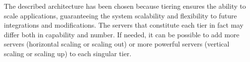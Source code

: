 The described architecture has been chosen because tiering ensures the ability to scale applications, guaranteeing the system scalability and flexibility to future integrations and modifications.
The servers that constitute each tier in fact may differ both in capability and number. If needed, it can be possible to add more servers (horizontal scaling or scaling out) or more powerful servers (vertical scaling or scaling up) to each singular tier.  



\newpage